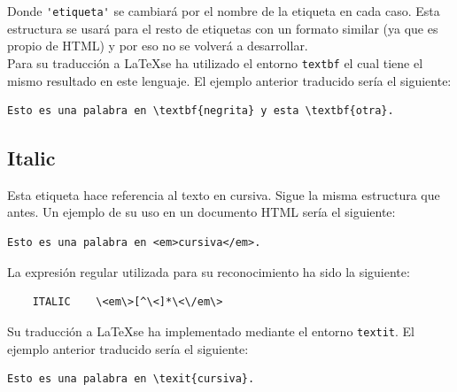 \documentclass[12pt]{article}
\begin{document}
Donde \verb|'etiqueta'| se cambiará por el nombre de la etiqueta en cada caso. Esta estructura se usará para el resto de etiquetas con un formato similar (ya que es propio de HTML) y por eso no se volverá a desarrollar.\\

Para su traducción a \LaTeX se ha utilizado el entorno \verb|textbf| el cual tiene el mismo resultado en este lenguaje. El ejemplo anterior traducido sería el siguiente:
\begin{verbatim}
Esto es una palabra en \textbf{negrita} y esta \textbf{otra}.
\end{verbatim}


\subsection{Italic}
Esta etiqueta hace referencia al texto en cursiva. Sigue la misma estructura que antes. Un ejemplo de su uso en un documento HTML sería el siguiente:
\begin{verbatim}
Esto es una palabra en <em>cursiva</em>.
\end{verbatim}
La expresión regular utilizada para su reconocimiento ha sido la siguiente:
\begin{verbatim}
    ITALIC    \<em\>[^\<]*\<\/em\>
\end{verbatim}
Su traducción a \LaTeX se ha implementado mediante el entorno \verb|textit|. El ejemplo anterior traducido sería el siguiente:
\begin{verbatim}
Esto es una palabra en \texit{cursiva}.
\end{verbatim}
\end{document}
